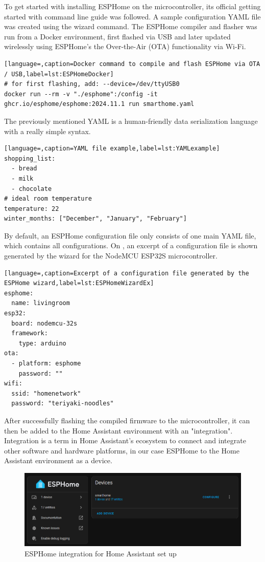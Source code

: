 To get started with installing ESPHome on the microcontroller, its official getting started with command line guide was followed. \cite{ESPHomeGettingStarted} A sample configuration YAML file was created using the wizard command. The ESPHome compiler and flasher was run from a Docker environment, first flashed via USB and later updated wirelessly using ESPHome's the Over-the-Air (OTA) functionality via Wi-Fi.

\begin{lstlisting}[language=,caption=Docker command to compile and flash ESPHome via OTA / USB,label=lst:ESPHomeDocker]
# for first flashing, add: --device=/dev/ttyUSB0
docker run --rm -v "./esphome":/config -it ghcr.io/esphome/esphome:2024.11.1 run smarthome.yaml
\end{lstlisting}

The previously mentioned YAML is a human-friendly data serialization language with a really simple syntax. \cite{YAMLHomepage}

\begin{lstlisting}[language=,caption=YAML file example,label=lst:YAMLexample]
shopping_list:
  - bread
  - milk
  - chocolate
# ideal room temperature
temperature: 22
winter_months: ["December", "January", "February"]
\end{lstlisting}

By default, an ESPHome configuration file only consists of one main YAML file, which contains all configurations. On , an excerpt of a configuration file is shown generated by the wizard for the NodeMCU ESP32S microcontroller.

\begin{lstlisting}[language=,caption=Excerpt of a configuration file generated by the ESPHome wizard,label=lst:ESPHomeWizardEx]
esphome:
  name: livingroom
esp32:
  board: nodemcu-32s
  framework:
    type: arduino
ota:
  - platform: esphome
    password: ""
wifi:
  ssid: "homenetwork"
  password: "teriyaki-noodles"
\end{lstlisting}

After successfully flashing the compiled firmware to the microcontroller, it can then be added to the Home Assistant environment with an "integration". Integration is a term in Home Assistant's ecosystem to connect and integrate other software and hardware platforms, in our case ESPHome to the Home Assistant environment as a device. \cite{HAConceptsTerminology}

\begin{figure}[!ht]
  \centering
  \includegraphics[width=150mm, keepaspectratio]{figures/homeassistant_esphome_int.png}
  \caption{ESPHome integration for Home Assistant set up}
  \label{fig:HAesphomeint}
\end{figure}

